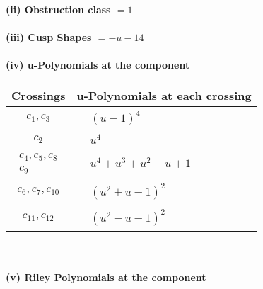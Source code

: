 \documentclass[1p]{elsarticle_modified}
\theoremstyle{definition}
\begin{document}
\flushleft \textbf{(ii) Obstruction class $= 1$}\\~\\
\flushleft \textbf{(iii) Cusp Shapes $= - u-14$}\\~\\
\newpage\renewcommand{\arraystretch}{1}
\flushleft \textbf{(iv) u-Polynomials at the component}\newline \\
\begin{tabular}{m{50pt}|m{274pt}}
Crossings & \hspace{64pt}u-Polynomials at each crossing \\
\hline $$\begin{aligned}c_{1},c_{3}\end{aligned}$$&$\begin{aligned}
&(u-1)^4
\end{aligned}$\\
\hline $$\begin{aligned}c_{2}\end{aligned}$$&$\begin{aligned}
&u^4
\end{aligned}$\\
\hline $$\begin{aligned}c_{4},c_{5},c_{8}\\c_{9}\end{aligned}$$&$\begin{aligned}
&u^4+u^3+u^2+u+1
\end{aligned}$\\
\hline $$\begin{aligned}c_{6},c_{7},c_{10}\end{aligned}$$&$\begin{aligned}
&(u^2+u-1)^2
\end{aligned}$\\
\hline $$\begin{aligned}c_{11},c_{12}\end{aligned}$$&$\begin{aligned}
&(u^2- u-1)^2
\end{aligned}$\\
\hline
\end{tabular}\\~\\
\newpage\renewcommand{\arraystretch}{1}
\flushleft \textbf{(v) Riley Polynomials at the component}\newline \\
\end{document}
